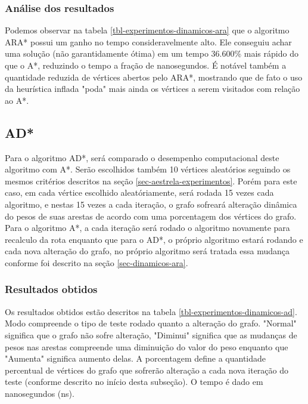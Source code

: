 \subsubsection{Análise dos resultados}
\label{sec-experimentos-dinamicos-ara-analise}

Podemos observar na tabela \ref{tbl-experimentos-dinamicos-ara} que o algoritmo ARA* possui um ganho no tempo consideravelmente alto. Ele conseguiu achar uma solução (não garantidamente ótima) em um tempo 36.600\% mais rápido do que o A*, reduzindo o tempo a fração de nanosegundos. É notável também a quantidade reduzida de vértices abertos pelo ARA*, mostrando que de fato o uso da heurística inflada "poda" mais ainda os vértices a serem visitados com relação ao A*.

\subsection{AD*}
\label{sec-experimentos-dinamicos-ad}

Para o algoritmo AD*, será comparado o desempenho computacional deste algoritmo com A*. Serão escolhidos também 10 vértices aleatórios seguindo os mesmos critérios descritos na seção \ref{sec-aestrela-experimentos}. Porém para este caso, em cada vértice escolhido aleatóriamente, será rodada 15 vezes cada algoritmo, e nestas 15 vezes a cada iteração, o grafo sofreará alteração dinâmica do pesos de suas arestas de acordo com uma porcentagem dos vértices do grafo. Para o algoritmo A*, a cada iteração será rodado o algoritmo novamente para recalculo da rota enquanto que para o AD*, o próprio algoritmo estará rodando e cada nova alteração do grafo, no próprio algoritmo será tratada essa mudança conforme foi descrito na seção \ref{sec-dinamicos-ara}.

\subsubsection{Resultados obtidos}
\label{sec-experimentos-dinamicos-ad-resultados}

Os resultados obtidos estão descritos na tabela \ref{tbl-experimentos-dinamicos-ad}. Modo compreende o tipo de teste rodado quanto a alteração do grafo. "Normal" significa que o grafo não sofre alteração, "Diminui" significa que as mudanças de pesos nas arestas compreende uma diminuição do valor do peso enquanto que "Aumenta" significa aumento delas. A porcentagem define a quantidade percentual de vértices do grafo que sofrerão alteração a cada nova iteração do teste (conforme descrito no início desta subseção). O tempo é dado em nanosegundos (ns).

